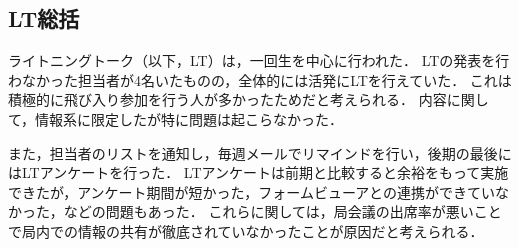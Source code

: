 \subsection*{LT総括}

ライトニングトーク（以下，LT）は，一回生を中心に行われた．
LTの発表を行わなかった担当者が4名いたものの，全体的には活発にLTを行えていた．
これは積極的に飛び入り参加を行う人が多かったためだと考えられる．
内容に関して，情報系に限定したが特に問題は起こらなかった．

また，担当者のリストを通知し，毎週メールでリマインドを行い，後期の最後にはLTアンケートを行った．
LTアンケートは前期と比較すると余裕をもって実施できたが，アンケート期間が短かった，フォームビューアとの連携ができていなかった，などの問題もあった．
これらに関しては，局会議の出席率が悪いことで局内での情報の共有が徹底されていなかったことが原因だと考えられる．